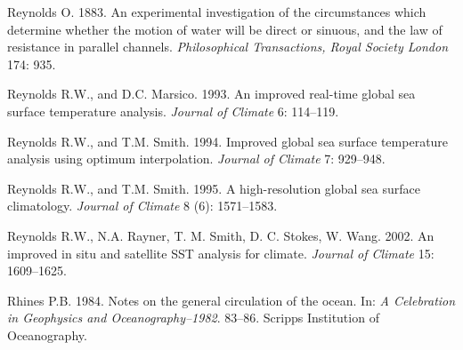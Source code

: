 \begin{thebibliography}{999}
Reynolds O.  1883. An experimental investigation of the circumstances
which determine whether the motion of water will be direct or sinuous,
and the law of resistance in parallel channels. \textit{Philosophical
  Transactions, Royal Society London} 174: 935.
%

Reynolds R.W., and D.C. Marsico.  1993. An improved real-time global
sea surface temperature analysis. \textit{Journal of Climate} 6:
114--119.
%

Reynolds R.W., and T.M. Smith.  1994. Improved global sea surface
temperature analysis using optimum interpolation. \textit{Journal of
  Climate} 7: 929--948.
%

Reynolds R.W., and T.M. Smith.  1995. A high-resolution global sea
surface climatology. \textit{Journal of Climate} 8 (6): 1571--1583.
%

Reynolds R.W., N.A. Rayner, T. M. Smith, D. C. Stokes,
W. Wang. 2002. An improved in situ and satellite SST analysis for
climate. \textit{Journal of Climate} 15: 1609--1625.
%

Rhines P.B.  1984. Notes on the general circulation of the ocean. In:
\textit{A Celebration in Geophysics and
  Oceanography--1982}. 83--86. Scripps Institution of Oceanography.
%


\end{thebibliography}

